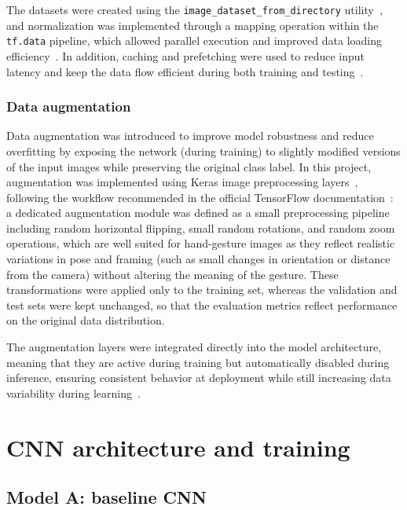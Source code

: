 \documentclass[11pt,a4paper]{article}
\begin{document}
The datasets were created using the \texttt{image\_dataset\_from\_directory} utility~\cite{tensorflow_imagedataset,keras_imageloading}, and normalization was implemented through a mapping operation within the \texttt{tf.data} pipeline, which allowed parallel execution and improved data loading efficiency~\cite{tensorflow_parallel_mapping}. In addition, caching and prefetching were used to reduce input latency and keep the data flow efficient during both training and testing~\cite{tensorflow_caching_prefetching}.

\subsubsection{Data augmentation}

Data augmentation was introduced to improve model robustness and reduce overfitting by exposing the network (during training) to slightly modified versions of the input images while preserving the original class label. In this project, augmentation was implemented using Keras image preprocessing layers~\cite{keras_augmentation_layers}, following the workflow recommended in the official TensorFlow documentation~\cite{tensorflow_data_augmentation_examples}: a dedicated augmentation module was defined as a small preprocessing pipeline including random horizontal flipping, small random rotations, and random zoom operations, which are well suited for hand-gesture images as they reflect realistic variations in pose and framing (such as small changes in orientation or distance from the camera) without altering the meaning of the gesture. These transformations were applied only to the training set, whereas the validation and test sets were kept unchanged, so that the evaluation metrics reflect performance on the original data distribution.

The augmentation layers were integrated directly into the model architecture, meaning that they are active during training but automatically disabled during inference, ensuring consistent behavior at deployment while still increasing data variability during learning~\cite{tensorflow_augmentation_inside_model}.

\section{CNN architecture and training}
\subsection{Model A: baseline CNN}
\end{document}

